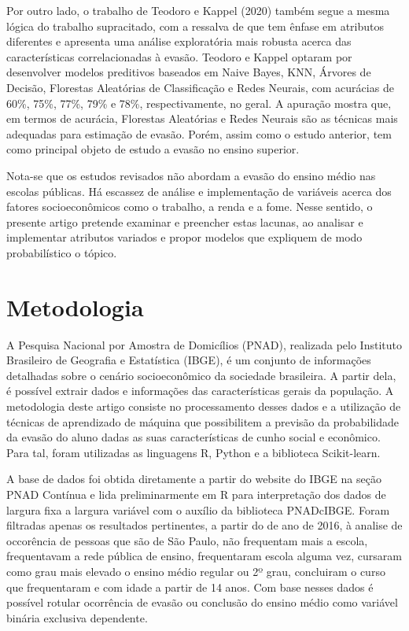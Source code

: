 \documentclass[english, spanish, brazilian]{RBIEarticle} %
\begin{document}
Por outro lado, o trabalho de Teodoro e Kappel (2020) também segue a mesma lógica do trabalho supracitado, com a ressalva de que tem ênfase em atributos diferentes e apresenta uma análise exploratória mais robusta acerca das características correlacionadas à evasão. Teodoro e Kappel optaram por desenvolver modelos preditivos baseados em Naive Bayes, KNN, Árvores de Decisão, Florestas Aleatórias de Classificação e Redes Neurais, com acurácias de 60\%, 75\%, 77\%, 79\% e 78\%, respectivamente, no geral. A apuração mostra que, em termos de acurácia, Florestas Aleatórias e Redes Neurais são as técnicas mais adequadas para estimação de evasão. Porém, assim como o estudo anterior, tem como principal objeto de estudo a evasão no ensino superior.  

Nota-se que os estudos revisados não abordam a evasão do ensino médio nas escolas públicas. Há escassez de análise e implementação de variáveis acerca dos fatores socioeconômicos como o trabalho, a renda e a fome. Nesse sentido, o presente artigo pretende examinar e preencher estas lacunas, ao analisar e implementar atributos variados e propor modelos que expliquem de modo probabilístico o tópico.

\section{Metodologia}
A Pesquisa Nacional por Amostra de Domicílios (PNAD), realizada pelo Instituto Brasileiro de Geografia e Estatística (IBGE), é um conjunto de informações detalhadas sobre o cenário socioeconômico da sociedade brasileira. A partir dela, é possível extrair dados e informações das características gerais da população. A metodologia deste artigo consiste no processamento desses dados e a utilização de técnicas de aprendizado de máquina que possibilitem a previsão da probabilidade da evasão do aluno dadas as suas características de cunho social e econômico. Para tal, foram utilizadas as linguagens R, Python e a biblioteca Scikit-learn.

A base de dados foi obtida diretamente a partir do website do IBGE na seção PNAD Contínua e lida preliminarmente em R para interpretação dos dados de largura fixa a largura variável com o auxílio da biblioteca PNADcIBGE. Foram filtradas apenas os resultados pertinentes, a partir do de ano de 2016, à analise de occorência de pessoas que são de São Paulo, não frequentam mais a escola, frequentavam a rede pública de ensino, frequentaram escola alguma vez, cursaram como grau mais elevado o ensino médio regular ou 2º grau, concluiram o curso que frequentaram e com idade a partir de 14 anos. Com base nesses dados é possível rotular ocorrência de evasão ou conclusão do ensino médio como variável binária exclusiva dependente.
\end{document}
